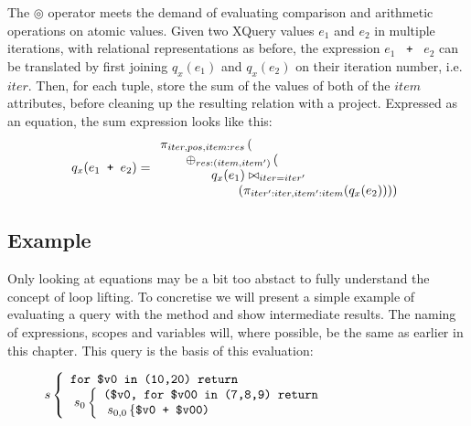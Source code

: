 The $\circledcirc$ operator meets the demand of evaluating comparison and arithmetic operations on atomic values.
Given two XQuery values $e_{1}$ and $e_{2}$ in multiple iterations, with relational representations as before,
the expression $e_{1}$ \texttt{ + } $e_{2}$ can be translated by first joining $q_{x}(e_{1})$ and $q_{x}(e_{2})$
on their iteration number, i.e. $iter$. Then, for each tuple, store the sum of the values of both of the $item$
attributes, before cleaning up the resulting relation with a project. Expressed as an equation, the sum expression looks like
this:
\begin{equation}
q_{x}(e_{1} \mbox{\texttt{ + }} e_{2}) =
\begin{array}{l}
\pi_{iter,pos,item:res}\left(\right. \\ \qquad
\oplus_{res:(item,item')}
\left( \right. \\ \qquad \qquad

	q_{x}(e_{1})
	\bowtie_{iter = iter'}
	 \\ \qquad \qquad \qquad
	\left.\left(\pi_{iter':iter, item':item}(q_{x}(e_{2}))
	\right)
\right)
\end{array}
\label{eq:ll:sumexpr}
\end{equation}

\subsection{Example}
\label{sect:trans:ll:example}

Only looking at equations may be a bit too abstact to fully understand the concept of loop lifting. To
concretise we will present a simple example of evaluating a query with the method and show intermediate results.
The naming of expressions, scopes and variables will, where possible, be the same as earlier in this chapter. This
query is the basis of this evaluation:

\begin{figure*}[h!]
\centering
\begin{math}
s\left\{
\begin{array}{l}
\mbox{\texttt{for \$v0 in (10,20) return}} \\ \;
s_{0}\left\{
\begin{array}{l}
\mbox{\texttt{(\$v0, for \$v00 in (7,8,9) return}} \\ \;
s_{0,0}\left\{ \mbox{\texttt{\$v0 + \$v00)}}\right.
\end{array}
\right.
\end{array}
\right.
\end{math}
\end{figure*}

